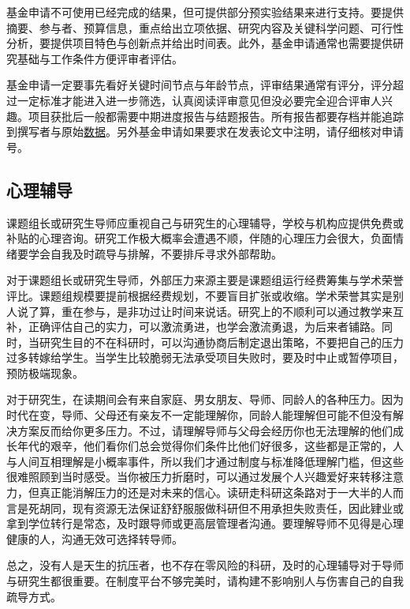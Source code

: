\documentclass[]{tufte-book}
\begin{document}
基金申请不可使用已经完成的结果，但可提供部分预实验结果来进行支持。要提供摘要、参与者、预算信息，重点给出立项依据、研究内容及关键科学问题、可行性分析，要提供项目特色与创新点并给出时间表。此外，基金申请通常也需要提供研究基础与工作条件方便评审者评估。

基金申请一定要事先看好关键时间节点与年龄节点，评审结果通常有评分，评分超过一定标准才能进入进一步筛选，认真阅读评审意见但没必要完全迎合评审人兴趣。项目获批后一般都需要中期进度报告与结题报告。所有报告都要存档并能追踪到撰写者与原始\href{http://journals.plos.org/plosbiology/article?id=10.1371/journal.pbio.1002333}{数据}。另外基金申请如果要求在发表论文中注明，请仔细核对申请号。

\hypertarget{ux5fc3ux7406ux8f85ux5bfc}{%
\subsection{心理辅导}\label{ux5fc3ux7406ux8f85ux5bfc}}

课题组长或研究生导师应重视自己与研究生的心理辅导，学校与机构应提供免费或补贴的心理咨询。研究工作极大概率会遭遇不顺，伴随的心理压力会很大，负面情绪要学会自我及时疏导与排解，不要排斥寻求外部帮助。

对于课题组长或研究生导师，外部压力来源主要是课题组运行经费筹集与学术荣誉评比。课题组规模要提前根据经费规划，不要盲目扩张或收缩。学术荣誉其实是别人说了算，重在参与，是非功过让时间来说话。研究上的不顺利可以通过教学来互补，正确评估自己的实力，可以激流勇进，也学会激流勇退，为后来者铺路。同时，当研究生目的不在科研时，可以沟通协商后制定退出策略，不要把自己的压力过多转嫁给学生。当学生比较脆弱无法承受项目失败时，要及时中止或暂停项目，预防极端现象。

对于研究生，在读期间会有来自家庭、男女朋友、导师、同龄人的各种压力。因为时代在变，导师、父母还有亲友不一定能理解你，同龄人能理解但可能不但没有解决方案反而给你更多压力。不过，请理解导师与父母会经历你也无法理解的他们成长年代的艰辛，他们看你们总会觉得你们条件比他们好很多，这些都是正常的，人与人间互相理解是小概率事件，所以我们才通过制度与标准降低理解门槛，但这些很难照顾到当时感受。当你被压力折磨时，可以通过发展个人兴趣爱好来转移注意力，但真正能消解压力的还是对未来的信心。读研走科研这条路对于一大半的人而言是死胡同，现有资源无法保证舒舒服服做科研但不用承担失败责任，因此肄业或拿到学位转行是常态，及时跟导师或更高层管理者沟通。要理解导师不见得是心理健康的人，沟通无效可选择转导师。

总之，没有人是天生的抗压者，也不存在零风险的科研，及时的心理辅导对于导师与研究生都很重要。在制度平台不够完美时，请构建不影响别人与伤害自己的自我疏导方式。
\end{document}
